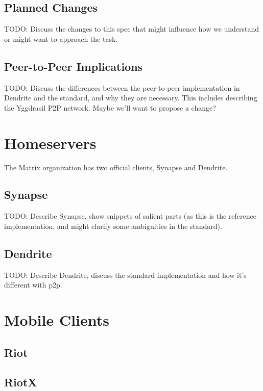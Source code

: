 \subsection{Planned Changes}
TODO:
    Discuss the changes to this spec that might influence how we understand or might want to approach the task.

\subsection{Peer-to-Peer Implications}
TODO: 
    Discuss the differences between the peer-to-peer implementation in Dendrite and the standard, and why they are necessary.
    This includes describing the Yggdrasil P2P network.
    Maybe we'll want to propose a change?

\section{Homeservers}
The Matrix organization has two official clients, Synapse\cite{matrix_org_synapse} and Dendrite\cite{matrix_org_dendrite}.

\subsection{Synapse}
TODO:
    Describe Synapse, show snippets of salient parts (as this is the reference implementation, and might clarify some ambiguities in the standard).
\subsection{Dendrite}
TODO:
    Describe Dendrite, discuss the standard implementation and how it's different with p2p.

\section{Mobile Clients}
\subsection{Riot}
\subsection{RiotX}


